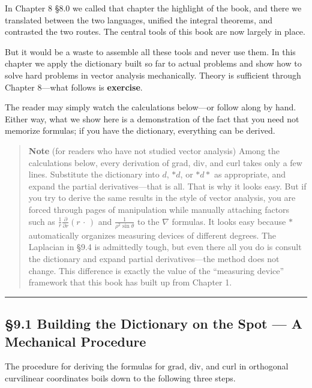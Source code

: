 In Chapter 8 §8.0 we called that chapter the highlight of the book, and
there we translated between the two languages, unified the integral
theorems, and contrasted the two routes. The central tools of this book
are now largely in place.

But it would be a waste to assemble all these tools and never use them.
In this chapter we apply the dictionary built so far to actual problems
and show how to solve hard problems in vector analysis mechanically.
Theory is sufficient through Chapter 8---what follows is
\textbf{exercise}.

The reader may simply watch the calculations below---or follow along by
hand. Either way, what we show here is a demonstration of the fact that
you need not memorize formulas; if you have the dictionary, everything
can be derived.

\begin{quote}
\textbf{Note} (for readers who have not studied vector analysis) Among
the calculations below, every derivation of grad, div, and curl takes
only a few lines. Substitute the dictionary into \(d\), \(\ast d\), or
\(\ast d\ast\) as appropriate, and expand the partial derivatives---that
is all. That is why it looks easy. But if you try to derive the same
results in the style of vector analysis, you are forced through pages of
manipulation while manually attaching factors such as
\(\frac{1}{r}\frac{\partial}{\partial r}(r\,\cdot\,)\) and
\(\frac{1}{\rho^2\sin\theta}\) to the \(\nabla\) formulas. It looks easy
because \(\ast\) automatically organizes measuring devices of different
degrees. The Laplacian in §9.4 is admittedly tough, but even there all
you do is consult the dictionary and expand partial derivatives---the
method does not change. This difference is exactly the value of the
``measuring device'' framework that this book has built up from Chapter
1.
\end{quote}

\begin{center}\rule{0.5\linewidth}{0.5pt}\end{center}

\hypertarget{building-the-dictionary-on-the-spot-a-mechanical-procedure}{%
\subsection{§9.1 Building the Dictionary on the Spot --- A Mechanical
Procedure}\label{building-the-dictionary-on-the-spot-a-mechanical-procedure}}

The procedure for deriving the formulas for \(\mathrm{grad}\),
\(\mathrm{div}\), and \(\mathrm{curl}\) in orthogonal curvilinear
coordinates boils down to the following three steps.

